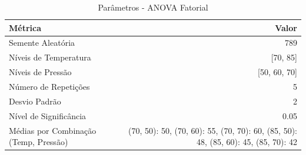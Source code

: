 \begin{table}[H]
\centering
\caption{Parâmetros - ANOVA Fatorial}
\label{tab:parametros_fatorial}
\begin{tabular}{|l|r|}
\hline
\textbf{Métrica} & \textbf{Valor} \\
\hline
Semente Aleatória & 789 \\
Níveis de Temperatura & [70, 85] \\
Níveis de Pressão & [50, 60, 70] \\
Número de Repetições & 5 \\
Desvio Padrão & 2 \\
Nível de Significância & 0.05 \\
Médias por Combinação (Temp, Pressão) & {(70, 50): 50, (70, 60): 55, (70, 70): 60, (85, 50): 48, (85, 60): 45, (85, 70): 42} \\
\hline
\end{tabular}
\end{table}
